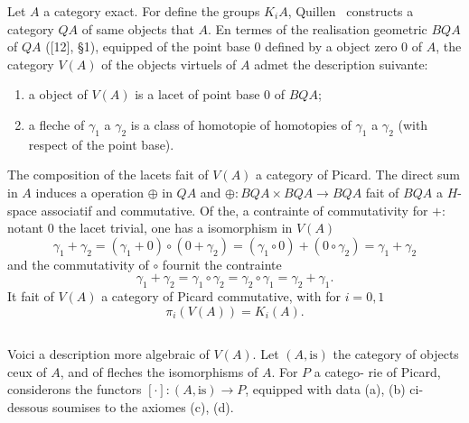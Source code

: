 \documentclass[12pt,a4paper]{article}
\theoremstyle{plain}
\theoremstyle{definition}
\begin{document}
Let $A$ a category exact. For define the groups $K_i A$, Quillen~\cite{12}
constructs a category $QA$ of same objects that $A$. En termes of the realisation
geometric $BQA$ of $QA$ ([12], \S1), equipped of the point base $0$ defined by a object
zero $0$ of $A$, the category $V(A)$ of the objects virtuels of $A$ admet the description
suivante:

\begin{enumerate}[label=(\alph*)]
\item a object of $V(A)$ is a lacet of point base $0$ of $BQA$;
\item a fleche of $\gamma_1$ a $\gamma_2$ is a class of homotopie of homotopies of
$\gamma_1$ a $\gamma_2$ (with respect of the point base).
\end{enumerate}
The composition of the lacets fait of $V(A)$ a category of Picard. The direct sum in $A$ induces a operation $\oplus$ in $QA$ and $\oplus: BQA \times BQA \to BQA$
fait of $BQA$ a $H$-space associatif and commutative. Of the, a contrainte of
commutativity for $+$: notant $0$ the lacet trivial, one has a isomorphism in $V(A)$
\begin{equation}\label{eq:4.2.1}
\gamma_1 + \gamma_2 = (\gamma_1 + 0) \circ (0 + \gamma_2) = (\gamma_1 \circ 0) + (0 \circ \gamma_2) = \gamma_1 + \gamma_2
\end{equation}
and the commutativity of $\circ$ fournit the contrainte
\begin{equation}\label{eq:4.2.2}
\gamma_1 + \gamma_2 = \gamma_1 \circ \gamma_2 = \gamma_2 \circ \gamma_1 = \gamma_2 + \gamma_1 .
\end{equation}
It fait of $V(A)$ a category of Picard commutative, with for $i = 0, 1$
\[
\pi_i(V(A)) = K_i(A) .
\]

\subsection{}

Voici a description more algebraic of $V(A)$. Let $(A, \text{is})$ the category
of objects ceux of $A$, and of fleches the isomorphisms of $A$. For $P$ a catego-
rie of Picard, considerons the functors $[\cdot]: (A, \text{is}) \to P$, equipped with data
(a), (b) ci-dessous soumises to the axiomes (c), (d).
\end{document}
